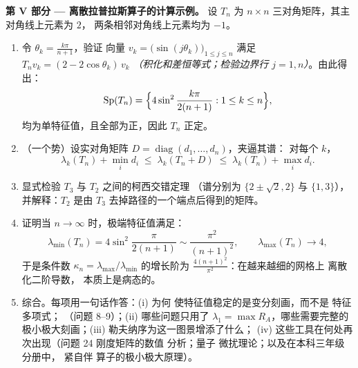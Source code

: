 \begin{problem}
\medskip
\noindent\textbf{第 V 部分 --- 离散拉普拉斯算子的计算示例。}
设 $T_n$ 为 $n \times n$ 三对角矩阵，其主对角线上元素为 $2$，
两条相邻对角线上元素均为 $-1$。
\begin{enumerate}[resume]
  \item 令 $\theta_k = \frac{k\pi}{n+1}$，验证
        向量 $v_k = \bigl(\sin(j\theta_k)\bigr)_{1\leq j\leq
        n}$ 满足 $T_nv_k = (2 - 2\cos\theta_k)\,v_k$
        \emph{（积化和差恒等式；检验边界行
        $j = 1, n$）}。由此得出：
        \[
        \operatorname{Sp}(T_n) = \Bigl\{4\sin^2
        \frac{k\pi}{2(n+1)} : 1 \leq k \leq n\Bigr\},
        \]
        均为单特征值，且全部为正，因此 $T_n$ 正定。
  \item （一个势）设实对角矩阵 $D =
        \operatorname{diag}(d_1, \dots, d_n)$，夹逼其谱：
        对每个 $k$，
        \[
        \lambda_k(T_n) + \min_i d_i \;\leq\;
        \lambda_k(T_n + D) \;\leq\; \lambda_k(T_n) + \max_i
        d_i .
        \]
  \item 显式检验 $T_3$ 与 $T_2$ 之间的柯西交错定理
        （谱分别为 $\{2 \pm \sqrt2, 2\}$ 与 $\{1,
        3\}$），并解释：$T_2$ 是由 $T_3$
        去掉路径的一个端点后得到的矩阵。
  \item 证明当 $n \to
        \infty$ 时，极端特征值满足：
        \[
        \lambda_{\min}(T_n) = 4\sin^2\frac{\pi}{2(n+1)}
        \sim \frac{\pi^2}{(n+1)^2},
        \qquad
        \lambda_{\max}(T_n) \to 4 ,
        \]
        于是条件数 $\kappa_n =
        \lambda_{\max}/\lambda_{\min}$ 的增长阶为
        $\frac{4(n+1)^2}{\pi^2}$：在越来越细的网格上
        离散化二阶导数，
        本质上是病态的。
  \item 综合。每项用一句话作答：(i) 为何
        使特征值稳定的是变分刻画，而不是
        特征多项式；
        （问题 8--9）；(ii) 哪些问题只用了
        $\lambda_1 = \max R_A$，哪些需要完整的
        极小极大刻画；(iii) 勒夫纳序为这一图景增添了什么；
        (iv) 这些工具在何处再次出现（问题 24 刚度矩阵的数值
        分析；量子
        微扰理论；以及在本科三年级分册中，
        紧自伴
        算子的极小极大原理）。
\end{enumerate}
\end{problem}
